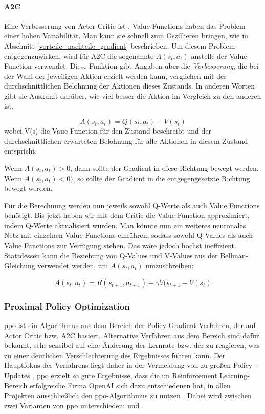 \paragraph{A2C}
Eine Verbesserung von Actor Critic ist . Value Functions haben das Problem einer hohen Variabilität. Man kann sie schnell zum Oszillieren bringen, wie in Abschnitt \ref{vorteile_nachteile_gradient} beschrieben.
Um diesem Problem entgegenzuwirken, wird für A2C die sogenannte  $A(s_t,a_t)$ anstelle der Value Function verwendet. Diese Funktion gibt Angaben über die \textit{Verbesserung}, die bei der Wahl der jeweiligen Aktion erzielt werden kann, verglichen mit der durchschnittlichen Belohnung der Aktionen dieses Zustands. In anderen Worten gibt sie Auskunft darüber, wie viel besser die Aktion im Vergleich zu den anderen ist.


$$ A(s_t,a_t)  =  Q(s_t,a_t) - V(s_t)  $$
wobei V(s) die Vaue Function für den Zustand beschreibt und der durchschnittlichen erwarteten Belohnung für alle Aktionen in diesem Zustand entspricht.

Wenn $A(s_t,a_t) > 0$, dann sollte der Gradient in diese Richtung bewegt werden. Wenn $A(s_t,a_t) < 0)$, so sollte der Gradient in die entgegengesetzte Richtung bewegt werden.

Für die Berechnung werden nun jeweils sowohl Q-Werte als auch Value Functions benötigt. Bis jetzt haben wir mit dem Critic die Value Function approximiert, indem Q-Werte aktualisiert wurden. Man könnte nun ein weiteres neuronales Netz mit einzelnen Value Functions einführen, sodass sowohl Q-Values als auch Value Functions zur Verfügung stehen. Das wäre jedoch höchst ineffizient. Stattdessen kann die Beziehung von Q-Values und V-Values aus der Bellman-Gleichung verwendet werden, um $A(s_t,a_t)$ umzuschreiben:

$$ A(s_t,a_t)  =  R(s_{t+1},a_{t+1})  + \gamma   V(s_{t+1} - V(s_t)  $$



\subsubsection{Proximal Policy Optimization}\label{proximal_policy_optimization}
\ac{ppo} ist ein Algorithmus aus dem Bereich der Policy Gradient-Verfahren, der auf Actor Critic bzw. A2C basiert. Alternative Verfahren aus dem Bereich sind dafür bekannt, sehr sensibel auf eine Änderung der Lernrate bzw. der  zu reagieren, was zu einer deutlichen Verschlechterung des Ergebnisses führen kann. Der Hauptfokus des Verfahrens liegt daher in der Vermeidung von zu großen Policy-Updates \cite{ppo_paper} \cite{openai_ppo_blog} \cite{ppo_openai_doc} \cite{hui_ppo}. \ac{ppo} erzielt so gute Ergebnisse, dass die im Reinforcement Learning-Bereich erfolgreiche Firma OpenAI sich dazu entschiedenen hat, in allen Projekten ausschließlich den \ac{ppo}-Algorithmus zu nutzen \cite{openai_ppo_blog}. Dabei wird zwischen zwei Varianten von \ac{ppo} unterschieden:  und .

